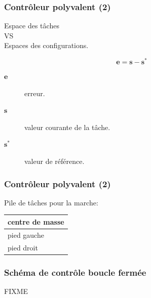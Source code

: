 \documentclass[14pt,utf8x,hyperref={pdfpagelabels=false}]{beamer}
\begin{document}
\begin{slideAction}
  \frametitle{Contrôleur polyvalent (2)}

  \begin{changeleftmargin}{1.1cm}
  \begin{center}
    Espace des tâches\\
    VS\\
    Espaces des configurations.

    \bigskip

    \begin{equation*}
      \mathbf{e} = \mathbf{s} - \mathbf{s}^{*}
    \end{equation*}

    \begin{description}
      \item[$\mathbf{e}$] erreur.
      \item[$\mathbf{s}$] valeur courante de la tâche.
      \item[$\mathbf{s}^{*}$] valeur de référence.
    \end{description}
  \end{center}
  \end{changeleftmargin}
\end{slideAction}

\begin{slideAction}
  \frametitle{Contrôleur polyvalent (2)}

  \begin{changeleftmargin}{1.1cm}
  \begin{center}

    Pile de tâches pour la marche:

    \bigskip

    \begin{tabular}{|l|}
      \hline
      centre de masse\\
      \hline
      pied gauche\\
      \hline
      pied droit\\
      \hline
    \end{tabular}

  \end{center}
  \end{changeleftmargin}
\end{slideAction}

\begin{slideAction}
  \frametitle{Schéma de contrôle boucle fermée}

  FIXME
\end{slideAction}
\end{document}
